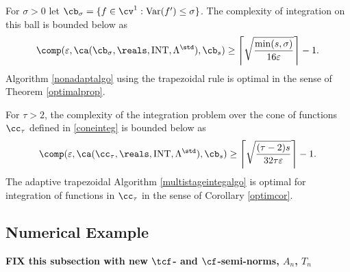 \begin{theorem} \label{complowbdinteg} For $\sigma>0$ let $\cb_{\sigma}=\{f \in \cv^{1} : \Var(f') \le \sigma\}$.  The complexity of integration on this ball is bounded below as
\begin{equation*}
\comp(\varepsilon,\ca(\cb_{\sigma},\reals,\INT,\Lambda^{\std}),\cb_{s}) \ge \left \lceil \sqrt{\frac{\min(s,\sigma)}{16 \varepsilon}} \right \rceil -1 .
\end{equation*}
Algorithm \ref{nonadaptalgo} using the trapezoidal rule is optimal in the sense of Theorem \ref{optimalprop}.

For $\tau>2$, the complexity of the integration problem over the cone of functions $\cc_{\tau}$ defined in \eqref{coneinteg} is bounded below as
\begin{equation*}
\comp(\varepsilon,\ca(\cc_{\tau},\reals,\INT,\Lambda^{\std}),\cb_{s}) \ge \left \lceil \sqrt{\frac{(\tau-2)s}{32 \tau \varepsilon}} \right \rceil -1 .
\end{equation*}
The adaptive trapezoidal Algorithm \ref{multistageintegalgo} is optimal for integration of functions in $\cc_{\tau}$ in the sense of Corollary \ref{optimcor}.
\end{theorem}

\subsection{Numerical Example}
{\bf FIX this subsection with new $\tcf$- and $\cf$-semi-norms, $A_n$, $T_n$}

